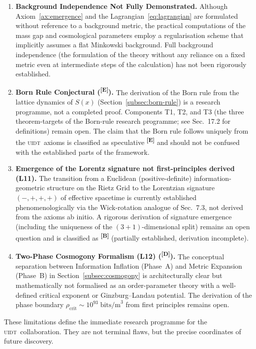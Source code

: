 \documentclass[12pt,a4paper,twoside]{article}
\theoremstyle{plain}
\theoremstyle{definition}
\theoremstyle{remark}
\newcommand{\UIDT}{\textsc{uidt}}
\newcommand{\catmark}[1]{\textsuperscript{\textsf{\textbf{[#1]}}}}
\begin{document}
\begin{enumerate}[label=\textbf{L\arabic*:}, leftmargin=*]
  \item \textbf{Background Independence Not Fully Demonstrated.}
    Although Axiom~\ref{ax:emergence} and the Lagrangian~\eqref{eq:lagrangian}
    are formulated without reference to a background metric, the practical
    computations of the mass gap and cosmological parameters employ a
    regularisation scheme that implicitly assumes a flat Minkowski
    background. Full background independence (the formulation of the theory
    without any reliance on a fixed metric even at intermediate steps of
    the calculation) has not been rigorously established.
 \newpage
  \item \textbf{Born Rule Conjectural (\catmark{E}).}
    The derivation of the Born rule from the lattice dynamics of $S(x)$
    (Section~\ref{subsec:born-rule}) is a research programme, not a
    completed proof. Components T1, T2, and T3 (the three theorem-targets
    of the Born-rule research programme; see Sec.~17.2 for definitions) remain open. The claim
    that the Born rule follows uniquely from the \UIDT\ axioms is classified
    as speculative \catmark{E} and should not be confused with the
    established parts of the framework.

  \item \textbf{Emergence of the Lorentz signature not first-principles derived (L11).}
    The transition from a Euclidean (positive-definite) information-geometric
    structure on the Rietz Grid to the Lorentzian signature $(-,+,+,+)$ of
    effective spacetime is currently established phenomenologically via the
    Wick-rotation analogue of Sec.~7.3, not derived from the axioms ab initio.
    A rigorous derivation of signature emergence (including the uniqueness
    of the $(3{+}1)$-dimensional split) remains an open question and is
    classified as \catmark{B} (partially established, derivation incomplete).

  \item \textbf{Two-Phase Cosmogony Formalism (L12) (\catmark{D}).}
    The conceptual separation between Information Inflation (Phase~A) and
    Metric Expansion (Phase~B) in Section~\ref{subsec:cosmogony} is
    architecturally clear but mathematically not formalised as an
    order-parameter theory with a well-defined critical exponent or
    Ginzburg--Landau potential. The derivation of the phase boundary
    $\rho_{\text{crit}} \sim 10^{93}\;\text{bits/m}^3$ from first
    principles remains open.
\end{enumerate}

These limitations define the immediate research programme for the \UIDT\
collaboration. They are not terminal flaws, but the precise coordinates of
future discovery.
\end{document}
